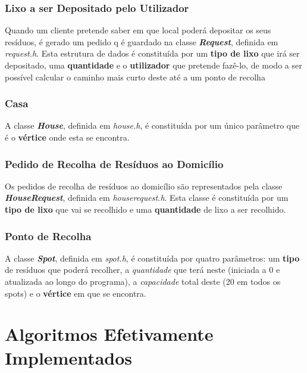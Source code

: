 \documentclass[article, a4paper, 12pt, oneside]{memoir}
\begin{document}
\subsection{Lixo a ser Depositado pelo Utilizador}

Quando um cliente pretende saber em que local poderá depositar os seus resíduos, é gerado um pedido q é guardado na classe \textbf{\textit{Request}}, definida em \textit{request.h}. Esta estrutura de dados é constituída por um \textbf{tipo de lixo} que irá ser depositado, uma \textbf{quantidade} e o \textbf{utilizador} que pretende fazê-lo, de modo a ser possível calcular o caminho mais curto deste até a um ponto de recolha

\subsection{Casa}

A classe \textbf{\textit{House}}, definida em \textit{house.h}, é constituída por um único parâmetro que é o \textbf{vértice} onde esta se encontra.

\subsection{Pedido de Recolha de Resíduos ao Domicílio}

Os pedidos de recolha de resíduos ao domicílio são representados pela classe \textbf{\textit{HouseRequest}}, definida em \textit{houserequest.h}. Esta classe é constituída por um \textbf{tipo de lixo} que vai se recolhido e uma \textbf{quantidade} de lixo a ser recolhido.

\subsection{Ponto de Recolha}

A classe \textbf{\textit{Spot}}, definida em \textit{spot.h}, é constituída por quatro parâmetros: um \textbf{tipo} de resíduos que poderá recolher, a \textit{quantidade} que terá neste (iniciada a 0 e atualizada ao longo do programa), a \textit{capacidade} total deste (20 em todos os spots) e o \textbf{vértice} em que se encontra.

\newpage
\chapter[Algoritmos Efetivamente Implementados][Algoritmos Efetivamente Implementados]{Algoritmos Efetivamente Implementados} \label{\thechapter}
\end{document}
